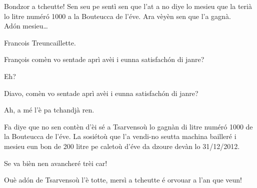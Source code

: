 \begin{drama}
\Journalistespeaks Bondzor a tcheutte! Sen seu pe sentì sen que l'at a no diye lo mesieu que la terià lo litre num\'er\'o 1000 a la Bouteucca de l'éve. Ara vèyèn sen que l'a gagnà.\\  Ad\'on mesieu\ldots

\Francoisspeaks{} Francois Treuncaillette.

\Journalistespeaks François comèn vo sentade aprì avèi i eunna satisfach\'on di janre?

\Francoisspeaks Eh?

\Journalistespeaks Diavo, comèn vo sentade aprì avèi i eunna satisfach\'on di janre?

\Francoisspeaks Ah, a mé l’è pa tchandjà ren.


\Seunteuccospeaks Fa diye que no sen contèn d'èi sé a Tsarvensoù lo gagnàn di litre num\'er\'o 1000 de la Bouteucca de l'éve. La sosiétoù que l’a vendi-no seutta machina bailleré i mesieu eun bon de 200 litre pe caletoù d'éve da dzoure devàn lo 31/12/2012.


\Prosperospeaks Se va bièn nen avancheré trèi car! \riye

\Journalistespeaks Ouè ad\'on de Tsarvensoù l'è totte, mersì a tcheut\-te é orvouar a l'an que veun!

\ridocliou

\DeriLeRido
{}

\end{drama}



